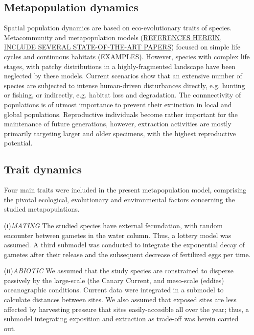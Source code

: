 \documentclass[12pt]{article}
\begin{document}
\begin{flushleft}
{{{{{\subsection{Metapopulation dynamics}
Spatial population dynamics are based on eco-evolutionary traits of species. Metacommunity and metapopulation models (\underline{REFERENCES HEREIN, INCLUDE SEVERAL STATE-OF-THE-ART PAPERS}) focused on simple life cycles and continuous habitats (EXAMPLES). However, species with complex life stages, with patchy distributions in a highly-fragmented landscape have been neglected by these models. Current scenarios show that an extensive number of species are subjected to intense human-driven disturbances directly, e.g. hunting or fishing, or indirectly, e.g. habitat loss and degradation. The connnectivity of populations is of utmost importance to prevent their extinction in local and global populations. Reproductive individuals become rather important for the maintenance of future generations, however, extraction activities are mostly primarily targeting larger and older specimens, with the highest reproductive potential.

\subsection {Trait dynamics}
Four main traits were included in the present metapopulation model, comprising the pivotal ecological, evolutionary and environmental factors concerning the studied metapopulations.

(i)\textit{MATING}
The studied species have external fecundation, with random encounter between gametes in the water column. Thus, a lottery model was assumed. A third submodel was conducted to integrate the exponential decay of gametes after their release and the subsequent decrease of fertilized eggs per time.

(ii)\textit{ABIOTIC}
We assumed that the study species are constrained to disperse passively by the large-scale (the Canary Current, \citep{barton1998transition} and meso-scale (eddies) oceanographic conditions. Current data were integrated in a submodel to calculate distances between sites. We also assumed that exposed sites are less affected by harvesting pressure that sites easily-accesible all over the year; thus, a submodel integrating exposition and extraction as trade-off was herein carried out.

}}}}}
\end{flushleft}
\end{document}
